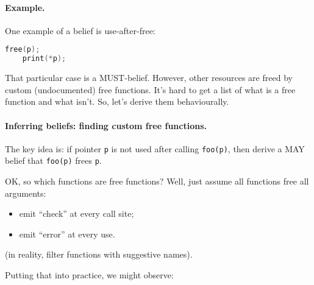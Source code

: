 \documentclass[11pt]{article}
\begin{document}
\paragraph{Example.} One example of a belief is use-after-free: 
 \begin{lstlisting}[language=C]
    free(p);
    print(*p);
 \end{lstlisting}
That particular case is a MUST-belief. 
However, other resources are freed by custom (undocumented) free functions.
It's hard to get a list of what is a free function and what isn't.
So, let's derive them behaviourally.

\paragraph{Inferring beliefs: finding custom free functions.}
The key idea is:
    if pointer {\tt p} is not used after calling {\tt foo(p)},
    then derive a MAY belief that {\tt foo(p)} frees {\tt p}.

OK, so which functions are free functions? Well, just assume all functions free all arguments:
\begin{itemize}
\item emit ``check'' at every call site;
\item emit ``error'' at every use.
\end{itemize}
(in reality, filter functions with suggestive names).

Putting that into practice,
we might observe:
\end{document}
